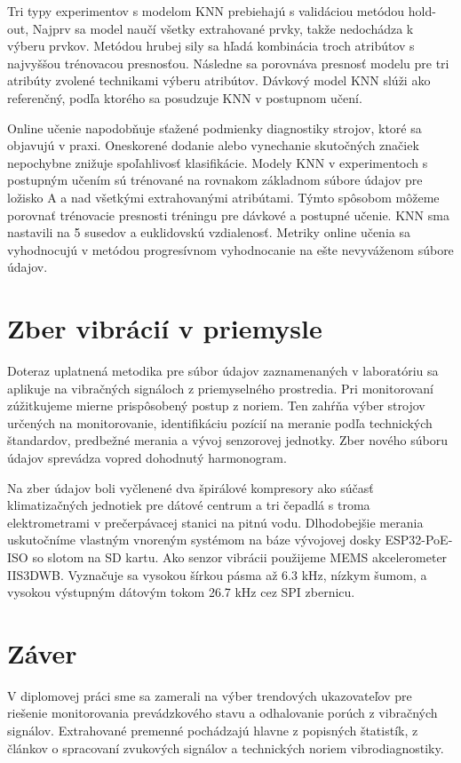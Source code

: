 Tri typy experimentov s modelom KNN prebiehajú s validáciou metódou hold-out, Najprv sa model naučí všetky extrahované prvky, takže nedochádza k výberu prvkov. Metódou hrubej sily sa hľadá kombinácia troch atribútov s najvyššou trénovacou presnosťou. Následne sa porovnáva presnosť modelu pre tri atribúty zvolené technikami výberu atribútov. Dávkový model KNN slúži ako referenčný, podľa ktorého sa posudzuje KNN v postupnom učení.

Online učenie napodobňuje sťažené podmienky diagnostiky strojov, ktoré sa objavujú v praxi. Oneskorené dodanie alebo vynechanie skutočných značiek nepochybne znižuje spoľahlivosť klasifikácie. Modely KNN v experimentoch s postupným učením sú trénované na rovnakom základnom súbore údajov pre ložisko A a nad všetkými extrahovanými atribútami. Týmto spôsobom môžeme porovnať trénovacie presnosti tréningu pre dávkové a postupné učenie. KNN sma nastavili na 5 susedov a euklidovskú vzdialenosť. Metriky online učenia sa vyhodnocujú v metódou progresívnom vyhodnocanie na ešte nevyváženom súbore údajov.

\section{Zber vibrácií v priemysle}
Doteraz uplatnená metodika pre súbor údajov zaznamenaných v laboratóriu sa aplikuje na vibračných signáloch z priemyselného prostredia. Pri monitorovaní zúžitkujeme mierne prispôsobený postup z noriem. Ten zahŕňa výber strojov určených na monitorovanie, identifikáciu pozícií na meranie podľa technických štandardov, predbežné merania a vývoj senzorovej jednotky. Zber nového súboru údajov sprevádza vopred dohodnutý harmonogram.

Na zber údajov boli vyčlenené dva špirálové kompresory ako súčasť klimatizačných jednotiek pre dátové centrum a tri čepadlá s troma elektrometrami v prečerpávacej stanici na pitnú vodu. Dlhodobejšie merania uskutočníme vlastným vnoreným systémom na báze vývojovej dosky ESP32-PoE-ISO so slotom na SD kartu. Ako senzor vibrácii použijeme MEMS akcelerometer IIS3DWB. Vyznačuje sa vysokou šírkou pásma až 6.3 kHz, nízkym šumom, a vysokou výstupným dátovým tokom 26.7 kHz cez SPI zbernicu.

\section{Záver}
V diplomovej práci sme sa zamerali na výber trendových ukazovateľov pre riešenie monitorovania prevádzkového stavu a odhalovanie porúch z vibračných signálov.  Extrahované premenné pochádzajú hlavne z popisných štatistík, z článkov o spracovaní zvukových signálov a technických noriem vibrodiagnostiky.

